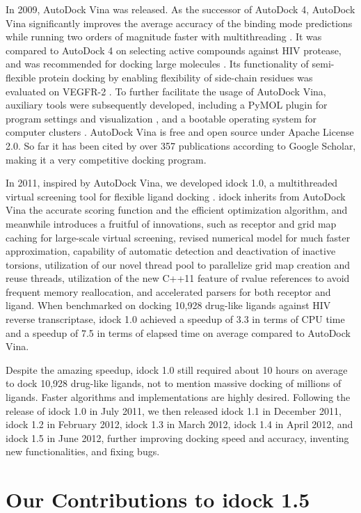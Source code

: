 \documentclass[10pt,conference,compsocconf]{../IEEEtran}
\begin{document}
In 2009, AutoDock Vina \citep{595} was released. As the successor of AutoDock 4, AutoDock Vina significantly improves the average accuracy of the binding mode predictions while running two orders of magnitude faster with multithreading \citep{595}. It was compared to AutoDock 4 on selecting active compounds against HIV protease, and was recommended for docking large molecules \citep{556}. Its functionality of semi-flexible protein docking by enabling flexibility of side-chain residues was evaluated on VEGFR-2 \citep{1084}. To further facilitate the usage of AutoDock Vina, auxiliary tools were subsequently developed, including a PyMOL plugin for program settings and visualization \citep{609}, and a bootable operating system for computer clusters \citep{773}. AutoDock Vina is free and open source under Apache License 2.0. So far it has been cited by over 357 publications according to Google Scholar, making it a very competitive docking program.

In 2011, inspired by AutoDock Vina, we developed idock 1.0, a multithreaded virtual screening tool for flexible ligand docking \citep{1153}. idock inherits from AutoDock Vina the accurate scoring function and the efficient optimization algorithm, and meanwhile introduces a fruitful of innovations, such as receptor and grid map caching for large-scale virtual screening, revised numerical model for much faster approximation, capability of automatic detection and deactivation of inactive torsions, utilization of our novel thread pool to parallelize grid map creation and reuse threads, utilization of the new C++11 feature of rvalue references to avoid frequent memory reallocation, and accelerated parsers for both receptor and ligand. When benchmarked on docking 10,928 drug-like ligands against HIV reverse transcriptase, idock 1.0 achieved a speedup of 3.3 in terms of CPU time and a speedup of 7.5 in terms of elapsed time on average compared to AutoDock Vina.

Despite the amazing speedup, idock 1.0 still required about 10 hours on average to dock 10,928 drug-like ligands, not to mention massive docking of millions of ligands. Faster algorithms and implementations are highly desired. Following the release of idock 1.0 in July 2011, we then released idock 1.1 in December 2011, idock 1.2 in February 2012, idock 1.3 in March 2012, idock 1.4 in April 2012, and idock 1.5 in June 2012, further improving docking speed and accuracy, inventing new functionalities, and fixing bugs.

\section{Our Contributions to idock 1.5}
\end{document}
